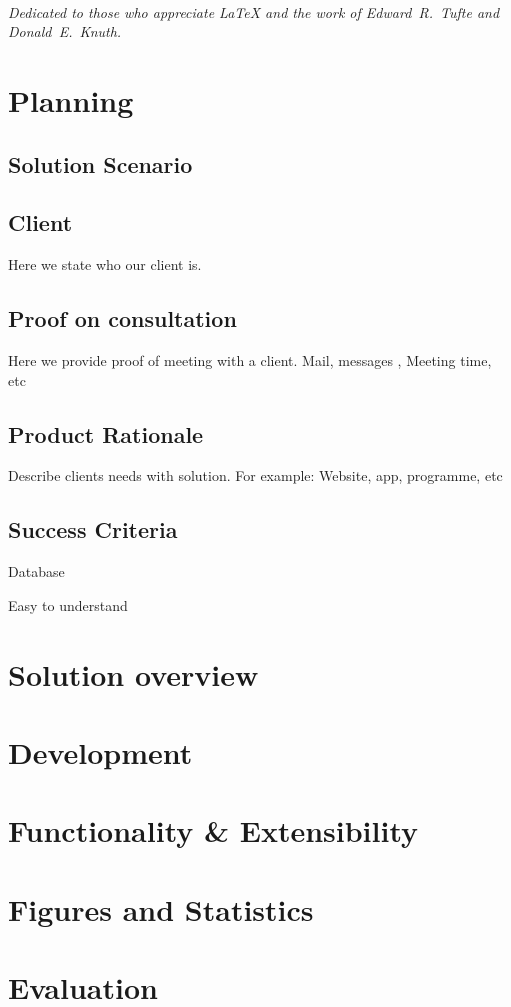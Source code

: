 \documentclass{tufte-book}
\begin{document}
\tableofcontents
 
\listoffigures
 
\listoftables
 
\cleardoublepage
~\vfill
\begin{doublespace}
\noindent\fontsize{18}{22}\selectfont\itshape
\nohyphenation
Dedicated to those who appreciate \LaTeX{}
and the work of \mbox{Edward R.~Tufte}
and \mbox{Donald E.~Knuth}.
\end{doublespace}
\vfill
\vfill
 
 
\cleardoublepage
\chapter*{Planning}
\section*{Solution Scenario}
\section*{Client}
Here we state who our client is.
\section{Proof on consultation}
Here we provide proof of meeting with a client. Mail, messages , Meeting time, etc
\section{Product Rationale}
Describe clients needs with solution. For example: Website, app, programme, etc
\section{Success Criteria}
\begin{description}
\item{Database}
\item{Easy to understand}
 
\end{description}
 
\chapter*{Solution overview}
\chapter*{Development}
\chapter*{Functionality \& Extensibility}
\chapter*{Figures and Statistics}
\chapter*{Evaluation}
 

 
\end{document}
